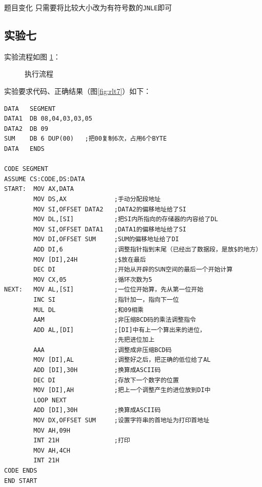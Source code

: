\documentclass[11pt]{SEU-Digital-Report}
\begin{document}
\begin{note}{题目变化}{}
    只需要将比较大小改为有符号数的\texttt{JNLE}即可
\end{note}

\subsection{实验七}
实验流程如图 \ref{fig:exp37}：
\begin{figure}[hbpt]
    \centering
    
    \caption{执行流程}
    \label{fig:exp37}
\end{figure}

实验要求代码、正确结果（图\ref{fig:rlt7}）如下：
\begin{lstlisting}[language={[x86masm]Assembler},title=exp37.asm]
    DATA   SEGMENT
DATA1  DB 08,04,03,03,05
DATA2  DB 09
SUM    DB 6 DUP(00)   ;把00复制6次，占用6个BYTE
DATA   ENDS 
    
CODE SEGMENT
ASSUME CS:CODE,DS:DATA
START:  MOV AX,DATA          
        MOV DS,AX             ;手动分配段地址
        MOV SI,OFFSET DATA2   ;DATA2的偏移地址给了SI
        MOV DL,[SI]           ;把SI内所指向的存储器的内容给了DL
        MOV SI,OFFSET DATA1   ;DATA1的偏移地址给了SI
        MOV DI,OFFSET SUM     ;SUM的偏移地址给了DI
        ADD DI,6              ;调整指针指到末尾（已经出了数据段，是放$的地方）
        MOV [DI],24H          ;$放在最后
        DEC DI                ;开始从开辟的SUN空间的最后一个开始计算
        MOV CX,05             ;循环次数为5
NEXT:   MOV AL,[SI]           ;一位位开始算，先从第一位开始
        INC SI                ;指针加一，指向下一位
        MUL DL                ;和09相乘
        AAM                   ;非压缩BCD码的乘法调整指令
        ADD AL,[DI]           ;[DI]中有上一个算出来的进位，
                              ;先把进位加上
        AAA                   ;调整成非压缩BCD码
        MOV [DI],AL           ;调整好之后，把正确的低位给了AL
        ADD [DI],30H          ;换算成ASCII码
        DEC DI                ;存放下一个数字的位置
        MOV [DI],AH           ;把上一个调整产生的进位放到DI中
        LOOP NEXT
        ADD [DI],30H          ;换算成ASCII码
        MOV DX,OFFSET SUM     ;设置字符串的首地址为打印首地址
        MOV AH,09H
        INT 21H               ;打印
        MOV AH,4CH
        INT 21H
CODE ENDS
END START    

\end{lstlisting}
\end{document}
